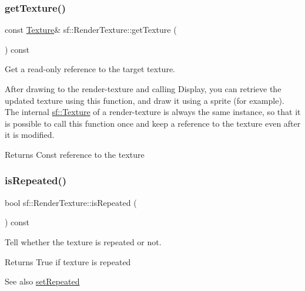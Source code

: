 \subsubsection{\texorpdfstring{get\+Texture()}{getTexture()}}
{\footnotesize\ttfamily const \hyperlink{classsf_1_1_texture}{Texture}\& sf\+::\+Render\+Texture\+::get\+Texture (\begin{DoxyParamCaption}{ }\end{DoxyParamCaption}) const}



Get a read-\/only reference to the target texture. 

After drawing to the render-\/texture and calling Display, you can retrieve the updated texture using this function, and draw it using a sprite (for example). The internal \hyperlink{classsf_1_1_texture}{sf\+::\+Texture} of a render-\/texture is always the same instance, so that it is possible to call this function once and keep a reference to the texture even after it is modified.

\begin{DoxyReturn}{Returns}
Const reference to the texture 
\end{DoxyReturn}
\mbox{\label{classsf_1_1_render_texture_a81c5a453a21c7e78299b062b97dc8c87}} 
\subsubsection{\texorpdfstring{is\+Repeated()}{isRepeated()}}
{\footnotesize\ttfamily bool sf\+::\+Render\+Texture\+::is\+Repeated (\begin{DoxyParamCaption}{ }\end{DoxyParamCaption}) const}



Tell whether the texture is repeated or not. 

\begin{DoxyReturn}{Returns}
True if texture is repeated
\end{DoxyReturn}
\begin{DoxySeeAlso}{See also}
\hyperlink{classsf_1_1_render_texture_af8f97b33512bf7d5b6be3da6f65f7365}{set\+Repeated} 
\end{DoxySeeAlso}
\mbox{\label{classsf_1_1_render_texture_a5b43c007ab6643accc5dae84b5bc8f61}} 

